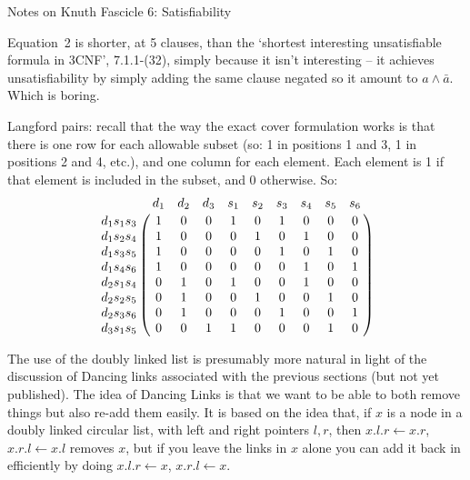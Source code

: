 \def\newstep#1{\smallskip \noindent {\bf #1}}

\topglue 0.5in
\centerline{Notes on Knuth Fascicle 6: Satisfiability}
\vskip 0.3in


\noindent [p 1] Equation~2 is shorter, at 5 clauses, than the `shortest
interesting unsatisfiable formula in 3CNF', 7.1.1-(32), simply because it isn't
interesting -- it achieves unsatisfiability by simply adding the
same clause negated so it amount to $a \wedge \bar a$.
Which is boring.

\vskip 0.1in 

\noindent [p. 5] Langford pairs: recall that the way the exact cover
formulation works is that there is one row for each allowable subset
(so: 1 in positions 1 and 3, 1 in positions 2 and 4, etc.), and one
column for each element.  Each element is 1 if that element
is included in the subset, and 0 otherwise.  So:
$$
 \bordermatrix{
  ~                   & d_1 & d_2 & d_3 & s_1 & s_2 & s_3 & s_4 & s_5 & s_6 \cr
   d_1 s_1 s_3 & 1    & 0     & 0     & 1     & 0     & 1     & 0     & 0     & 0    \cr
   d_1 s_2 s_4 & 1    & 0     & 0     & 0     & 1     & 0     & 1     & 0     & 0    \cr
   d_1 s_3 s_5 & 1    & 0     & 0     & 0     & 0     & 1     & 0     & 1     & 0    \cr
   d_1 s_4 s_6 & 1    & 0     & 0     & 0     & 0     & 0     & 1     & 0     & 1    \cr
   d_2 s_1 s_4 & 0    & 1     & 0     & 1     & 0     & 0     & 1     & 0     & 0    \cr
   d_2 s_2 s_5 & 0    & 1     & 0     & 0     & 1     & 0     & 0     & 1     & 0    \cr
   d_2 s_3 s_6 & 0    & 1     & 0     & 0     & 0     & 1     & 0     & 0     & 1    \cr
   d_3 s_1 s_5 & 0    & 0     & 1     & 1     & 0     & 0     & 0     & 1     & 0    \cr
 } 
$$

\vskip 0.1in 

\hfil\break
\noindent The use of the doubly linked list is presumably more
natural in light of the discussion of Dancing links associated with the
previous sections (but not yet published).  The idea of Dancing Links
is that we want to be able to both remove things but also re-add them
easily.  It is based on the idea that, if $x$ is a node in a doubly
linked circular list, with left and right pointers $l, r$, then
$x.l.r \gets x.r$, $x.r.l \gets x.l$ removes $x$, but if you leave
the links in $x$ alone you can add it back in efficiently by doing
$x.l.r \gets x$, $x.r.l \gets x$.

